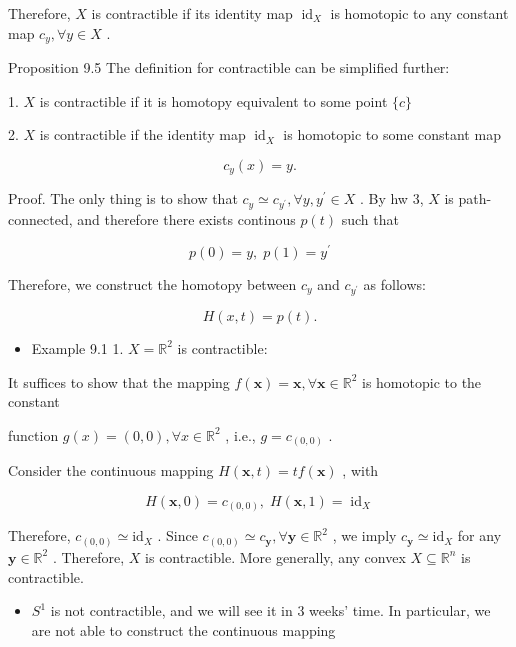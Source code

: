 Therefore, \(X\) is contractible if its identity map \({\operatorname{id}}_{X}\) is homotopic to any constant map \({c}_{y},\forall y \in  X\) .

Proposition 9.5 The definition for contractible can be simplified further:

1. \(X\) is contractible if it is homotopy equivalent to some point \(\{ c\}\)

2. \(X\) is contractible if the identity map \({\operatorname{id}}_{X}\) is homotopic to some constant map

\[
{c}_{y}\left( x\right)  = y.
\]

Proof. The only thing is to show that \({c}_{y} \simeq  {c}_{{y}^{\prime }},\forall y,{y}^{\prime } \in  X\) . By hw 3, \(X\) is path-connected, and therefore there exists continous \(p\left( t\right)\) such that

\[
p\left( 0\right)  = y,\;p\left( 1\right)  = {y}^{\prime }
\]

Therefore, we construct the homotopy between \({c}_{y}\) and \({c}_{{y}^{\prime }}\) as follows:

\[
H\left( {x,t}\right)  = p\left( t\right) .
\]

\begin{itemize}
\item Example 9.1 1. \(X = {\mathbb{R}}^{2}\) is contractible:
\end{itemize}

It suffices to show that the mapping \(f\left( \mathbf{x}\right)  = \mathbf{x},\forall \mathbf{x} \in  {\mathbb{R}}^{2}\) is homotopic to the constant

function \(g\left( x\right)  = \left( {0,0}\right) ,\forall x \in  {\mathbb{R}}^{2}\) , i.e., \(g = {c}_{\left( 0,0\right) }\) .

Consider the continuous mapping \(H\left( {\mathbf{x},t}\right)  = {tf}\left( \mathbf{x}\right)\) , with

\[
H\left( {\mathbf{x},0}\right)  = {c}_{\left( 0,0\right) },\;H\left( {\mathbf{x},1}\right)  = {\operatorname{id}}_{X}
\]

Therefore, \({c}_{\left( 0,0\right) } \simeq  {\mathrm{{id}}}_{X}\) . Since \({c}_{\left( 0,0\right) } \simeq  {c}_{\mathbf{y}},\forall \mathbf{y} \in  {\mathbb{R}}^{2}\) , we imply \({c}_{\mathbf{y}} \simeq  {\mathrm{{id}}}_{X}\) for any \(\mathbf{y} \in  {\mathbb{R}}^{2}\) . Therefore, \(X\) is contractible. More generally, any convex \(X \subseteq  {\mathbb{R}}^{n}\) is contractible.

\begin{itemize}
\item \({S}^{1}\) is not contractible, and we will see it in 3 weeks’ time. In particular, we are not able to construct the continuous mapping
\end{itemize}

